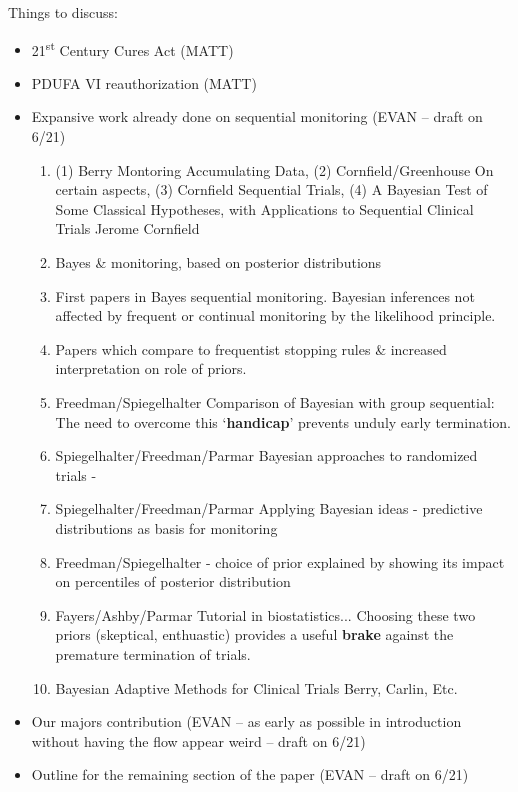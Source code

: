 \documentclass[12pt]{article}
\begin{document}
Things to discuss:
\begin{itemize}
 \item 21\textsuperscript{st} Century Cures Act (MATT)
 \item PDUFA VI reauthorization (MATT)
 \item Expansive work already done on sequential monitoring  (EVAN -- draft on 6/21)
\begin{enumerate}
\item (1) Berry Montoring Accumulating Data, (2) Cornfield/Greenhouse On certain aspects, (3) Cornfield Sequential Trials, (4) A Bayesian Test of Some Classical Hypotheses, with Applications to Sequential Clinical Trials
Jerome Cornfield 
\item Bayes \& monitoring, based on posterior distributions
\item First papers in Bayes sequential monitoring. Bayesian inferences not affected by frequent or continual monitoring by the likelihood principle.
\item Papers which compare to frequentist stopping rules \& increased interpretation on role of priors.
\item Freedman/Spiegelhalter Comparison of Bayesian with group sequential: The need to overcome this `\textbf{handicap}' prevents unduly early termination.
\item Spiegelhalter/Freedman/Parmar Bayesian approaches to randomized trials - 
\item Spiegelhalter/Freedman/Parmar Applying Bayesian ideas - predictive distributions as basis for monitoring
\item Freedman/Spiegelhalter - choice of prior explained by showing its impact on percentiles of posterior distribution
\item Fayers/Ashby/Parmar Tutorial in biostatistics... Choosing these two priors (skeptical, enthuastic) provides a useful \textbf{brake} against the premature termination of trials.
\item Bayesian
Adaptive Methods
for Clinical Trials Berry, Carlin, Etc.
\end{enumerate}
 \item Our majors contribution (EVAN -- as early as possible in introduction without having the flow appear weird -- draft on 6/21)
 \item Outline for the remaining section of the paper (EVAN -- draft on 6/21)
\end{itemize}
\end{document}
